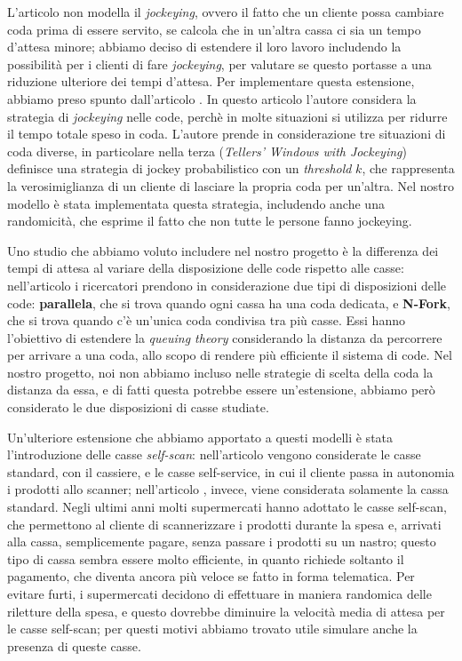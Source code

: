 L'articolo \cite{article1} non modella il \textit{jockeying}, ovvero il fatto che un cliente possa cambiare coda prima di essere servito, se calcola che in un'altra cassa ci sia un tempo d'attesa minore; abbiamo deciso di estendere il loro lavoro includendo la possibilità per i clienti di fare \textit{jockeying}, per valutare se questo portasse a una riduzione ulteriore dei tempi d'attesa. Per implementare questa estensione, abbiamo preso spunto dall'articolo \cite{koenigsberg1966jockeying}.
In questo articolo l'autore considera la strategia di \textit{jockeying} nelle code, perchè in molte situazioni si utilizza per ridurre il tempo totale speso in coda. L'autore prende in considerazione tre situazioni di coda diverse, in particolare nella terza (\textit{Tellers' Windows with Jockeying}) definisce una strategia di jockey probabilistico con un \textit{threshold} $k$, che rappresenta la verosimiglianza di un cliente di lasciare la propria coda per un'altra. Nel nostro modello è stata implementata questa strategia, includendo anche una randomicità, che esprime il fatto che non tutte le persone fanno jockeying.

Uno studio che abbiamo voluto includere nel nostro progetto è la differenza dei tempi di attesa al variare della disposizione delle code rispetto alle casse: nell'articolo \cite{yanagisawa2011methods} i ricercatori prendono in considerazione due tipi di disposizioni delle code: \textbf{parallela}, che si trova quando ogni cassa ha una coda dedicata, e \textbf{N-Fork}, che si trova quando c'è un'unica coda condivisa tra più casse. Essi hanno l'obiettivo di estendere la \textit{queuing theory} considerando la distanza da percorrere per arrivare a una coda, allo scopo di rendere più efficiente il sistema di code. Nel nostro progetto, noi non abbiamo incluso nelle strategie di scelta della coda la distanza da essa, e di fatti questa potrebbe essere un'estensione, abbiamo però considerato le due disposizioni di casse studiate. 

Un'ulteriore estensione che abbiamo apportato a questi modelli è stata l'introduzione delle casse \textit{self-scan}: nell'articolo \cite{article1} vengono considerate le casse standard, con il cassiere, e le casse self-service, in cui il cliente passa in autonomia i prodotti allo scanner; nell'articolo \cite{yanagisawa2011methods}, invece, viene considerata solamente la cassa standard. Negli ultimi anni molti supermercati hanno adottato le casse self-scan, che permettono al cliente di scannerizzare i prodotti durante la spesa e, arrivati alla cassa, semplicemente pagare, senza passare i prodotti su un nastro; questo tipo di cassa sembra essere molto efficiente, in quanto richiede soltanto il pagamento, che diventa ancora più veloce se fatto in forma telematica. Per evitare furti, i supermercati decidono di effettuare in maniera randomica delle riletture della spesa, e questo dovrebbe diminuire la velocità media di attesa per le casse self-scan; per questi motivi abbiamo trovato utile simulare anche la presenza di queste casse.

